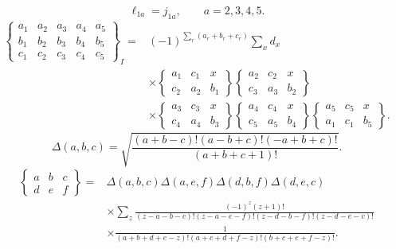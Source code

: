 \documentclass{article}
\begin{document}
\begin{equation}
\ell_{1a}=j_{1a},\qquad a=2,3,4,5.
\tag{B7}
\end{equation}
\begin{equation}
\begin{aligned}
\begin{Bmatrix}a_1&a_2&a_3&a_4&a_5\\b_1&b_2&b_3&b_4&b_5\\c_1&c_2&c_3&c_4&c_5\end{Bmatrix}_{I}
={}&(-1)^{\sum_r(a_r+b_r+c_r)}\sum_xd_x\\
&\times\begin{Bmatrix}a_1&c_1&x\\c_2&a_2&b_1\end{Bmatrix}\begin{Bmatrix}a_2&c_2&x\\c_3&a_3&b_2\end{Bmatrix}\\
&\times\begin{Bmatrix}a_3&c_3&x\\c_4&a_4&b_3\end{Bmatrix}\begin{Bmatrix}a_4&c_4&x\\c_5&a_5&b_4\end{Bmatrix}\begin{Bmatrix}a_5&c_5&x\\a_1&c_1&b_5\end{Bmatrix}.
\end{aligned}
\tag{R1}
\end{equation}
\begin{equation}
\Delta(a,b,c)=\sqrt{\frac{(a+b-c)!(a-b+c)!(-a+b+c)!}{(a+b+c+1)!}}.
\tag{R2}
\end{equation}
\begin{equation}
\begin{aligned}
\begin{Bmatrix}a&b&c\\d&e&f\end{Bmatrix}={}&\Delta(a,b,c)\Delta(a,e,f)\Delta(d,b,f)\Delta(d,e,c)\\
&\times\sum_z\frac{(-1)^z(z+1)!}{(z-a-b-c)!(z-a-e-f)!(z-d-b-f)!(z-d-e-c)!}\\
&\times\frac1{(a+b+d+e-z)!(a+c+d+f-z)!(b+c+e+f-z)!}.
\end{aligned}
\tag{R3}
\end{equation}
\end{document}
